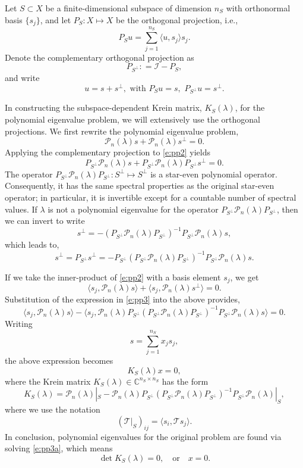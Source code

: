 \documentclass[review,onefignum,onetabnum]{siamart171218}
\newcommand{\C}{\mathbb{C}}
\def\det{\mathop\mathrm{det}\nolimits}
\def\id{\mathcal{I}}
\def\coloneqq{\mathrel{\mathop:}=}
\newcommand{\calP}{\mathcal{P}}
\newcommand{\calT}{\mathcal{T}}
\newcommand{\vK}{\bm{\mathit{K}}}
\newcommand{\vx}{\bm{\mathit{x}}}
\newcommand{\vn}{\bm{\mathit{0}}}
\begin{document}
Let $S\subset X$ be a finite-dimensional subspace of dimension $n_S$ with
orthonormal basis $\{s_j\}$, and let $P_S:X\mapsto X$ be the orthogonal
projection, i.e.,
\[
P_Su=\sum_{j=1}^{n_S}\langle u,s_j\rangle s_j.
\]
Denote the complementary orthogonal projection as
\[
P_{S^\perp}\coloneqq\id-P_S,
\]
and write
\[
u=s+s^\perp,\,\,\mathrm{with}\,\, P_Su=s,\,\,P_{S^\perp}u=s^\perp.
\]


In constructing the subspace-dependent Krein matrix, $\vK_S(\lambda)$, for
the polynomial eigenvalue problem, we will extensively use the orthogonal
projections. We first rewrite the polynomial eigenvalue problem,
\begin{equation}\label{e:pp2}
\calP_n(\lambda)s+\calP_n(\lambda)s^\perp=0.
\end{equation}
Applying the complementary projection to \cref{e:pp2} yields
\begin{equation}\label{e:pp2a}
P_{S^\perp}\calP_n(\lambda)s+P_{S^\perp}\calP_n(\lambda)P_{S^\perp}s^\perp=0.
\end{equation}
The operator $P_{S^\perp}\calP_n(\lambda)P_{S^\perp}:S^\perp\mapsto S^\perp$ is a star-even polynomial operator. Consequently, it has the same spectral properties as the original star-even operator; in particular, it is invertible except for a countable number of spectral values.
If $\lambda$ is not a polynomial eigenvalue for the operator
$P_{S^\perp}\calP_n(\lambda)P_{S^\perp}$, then we can invert to write
\[%
s^\perp=-(P_{S^\perp}\calP_n(\lambda)P_{S^\perp})^{-1}P_{S^\perp}\calP_n(\lambda)s,
\]%
which leads to,
\begin{equation}\label{e:pp3}
s^\perp=
P_{S^\perp}s^\perp=
-P_{S^\perp}(P_{S^\perp}\calP_n(\lambda)P_{S^\perp})^{-1}P_{S^\perp}\calP_n(\lambda)s.
\end{equation}

If we take the inner-product of \cref{e:pp2} with a basis element $s_j$, we
get
\[
\langle s_j,\calP_n(\lambda)s\rangle+\langle s_j,\calP_n(\lambda)s^\perp\rangle=0.
\]
Substitution of the expression in \cref{e:pp3} into the above provides,
\[
\langle s_j,\calP_n(\lambda)s\rangle-
\langle s_j,\calP_n(\lambda)P_{S^\perp}(P_{S^\perp}\calP_n(\lambda)P_{S^\perp})^{-1}P_{S^\perp}\calP_n(\lambda)s\rangle=0.
\]
Writing
\[
s=\sum_{j=1}^{n_S}x_js_j,
\]
the above expression becomes
\begin{equation}\label{e:pp3a}
\vK_S(\lambda)\vx=\vn,
\end{equation}
where the Krein matrix $\vK_S(\lambda)\in\C^{n_S\times n_S}$ has the form
\[
\vK_S(\lambda)=\calP_n(\lambda)|_S-%
\calP_n(\lambda)P_{S^\perp}(P_{S^\perp}\calP_n(\lambda)P_{S^\perp})^{-1}P_{S^\perp}\calP_n(\lambda)|_{S},
\]
where we use the notation
\[
\left(\calT|_S\right)_{ij}=\langle s_i,\calT s_j\rangle.
\]
%
In conclusion, polynomial
eigenvalues for the original problem are found via solving \cref{e:pp3a},
which means
\[
\det\vK_S(\lambda)=0,\quad\mathrm{or}\quad\vx=\vn.
\]
\end{document}
